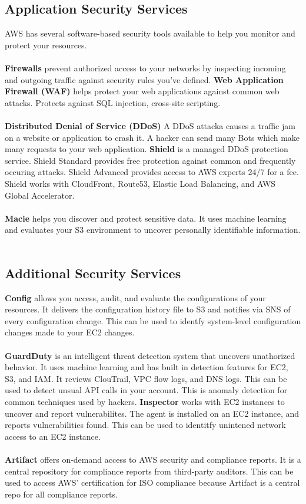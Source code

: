 \documentclass{article}%
\begin{document}
\subsection{Application Security Services}
AWS has several software-based security tools available to help you monitor and protect your resources. \\ \\
\textbf{Firewalls} prevent authorized access to your networks by inspecting incoming and outgoing traffic against security rules you've defined.
\textbf{Web Application Firewall (WAF)} helps protect your web applications against common web attacks. Protects against SQL injection, cross-site scripting.  \\ \\
\textbf{Distributed Denial of Service (DDoS)} A DDoS attacka causes a traffic jam on a website or application to crash it. A hacker can send many Bots which make many requests to your web application. 
\textbf{Shield} is a managed DDoS protection service. Shield Standard provides free protection against common and frequently occuring attacks. Shield Advanced provides access to AWS experts 24/7 for a fee. Shield works with CloudFront, Route53, Elastic Load Balancing, and AWS Global Accelerator.\\ \\
\textbf{Macie} helps you discover and protect sensitive data. It uses machine learning and evaluates your S3 environment to uncover personally identifiable information. \\ \\
\subsection{Additional Security Services}
\textbf{Config} allows you access, audit, and evaluate the configurations of your resources. It delivers the configuration history file to S3 and notifies via SNS of every configuration change. This can be used to identfy system-level configuration changes made to your EC2 changes. \\ \\
\textbf{GuardDuty} is an intelligent threat detection system that uncovers unathorized behavior. It uses machine learning and has built in detection features for EC2, S3, and IAM. It reviews ClouTrail, VPC flow logs, and DNS logs. This can be used to detect unsual API calls in your account. This is anomaly detection for common techniques used by hackers.
\textbf{Inspector} works with EC2 instances to uncover and report vulnerabilites. The agent is installed on an EC2 instance, and reports vulnerabilities found. This can be used to identitfy unintened network access to an EC2 instance. \\ \\
\textbf{Artifact} offers on-demand access to AWS security and compliance reports. It is a central repository for compliance reports from third-party auditors. This can be used to access AWS' certification for ISO compliance because Artifact is a central repo for all compliance reports.
\end{document}
